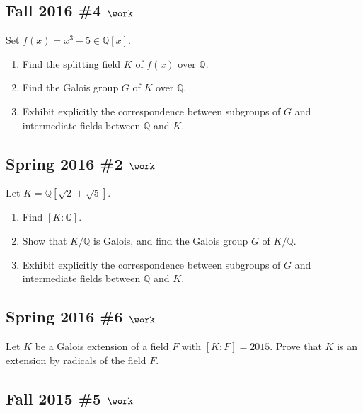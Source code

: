 \hypertarget{fall-2016-4-work}{%
\subsection{\texorpdfstring{Fall 2016 \#4
\(\work\)}{Fall 2016 \#4 \textbackslash work}}\label{fall-2016-4-work}}

Set \(f(x) = x^3 - 5 \in {\mathbb{Q}}[x]\).

\begin{enumerate}
\def\labelenumi{\alph{enumi}.}
\item
  Find the splitting field \(K\) of \(f(x)\) over \({\mathbb{Q}}\).
\item
  Find the Galois group \(G\) of \(K\) over \({\mathbb{Q}}\).
\item
  Exhibit explicitly the correspondence between subgroups of \(G\) and
  intermediate fields between \({\mathbb{Q}}\) and \(K\).
\end{enumerate}

\hypertarget{spring-2016-2-work}{%
\subsection{\texorpdfstring{Spring 2016 \#2
\(\work\)}{Spring 2016 \#2 \textbackslash work}}\label{spring-2016-2-work}}

Let \(K = {\mathbb{Q}}[\sqrt 2 + \sqrt 5]\).

\begin{enumerate}
\def\labelenumi{\alph{enumi}.}
\item
  Find \([K: {\mathbb{Q}}]\).
\item
  Show that \(K/{\mathbb{Q}}\) is Galois, and find the Galois group
  \(G\) of \(K/{\mathbb{Q}}\).
\item
  Exhibit explicitly the correspondence between subgroups of \(G\) and
  intermediate fields between \({\mathbb{Q}}\) and \(K\).
\end{enumerate}

\hypertarget{spring-2016-6-work}{%
\subsection{\texorpdfstring{Spring 2016 \#6
\(\work\)}{Spring 2016 \#6 \textbackslash work}}\label{spring-2016-6-work}}

Let \(K\) be a Galois extension of a field \(F\) with \([K: F] = 2015\).
Prove that \(K\) is an extension by radicals of the field \(F\).

\hypertarget{fall-2015-5-work}{%
\subsection{\texorpdfstring{Fall 2015 \#5
\(\work\)}{Fall 2015 \#5 \textbackslash work}}\label{fall-2015-5-work}}

